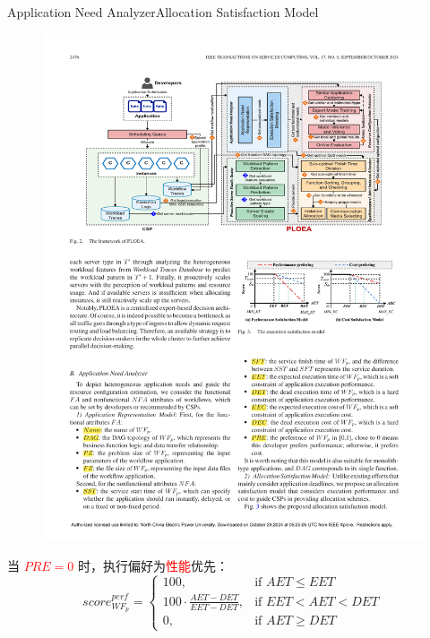 \documentclass[aspectratio=169]{beamer}
\begin{document}
\begin{frame}{Application Need Analyzer}{Allocation Satisfaction Model}
  \begin{figure}
    \centering
    \includegraphics[height=0.4\textheight]{img/method/satisfaction-model.pdf}
  \end{figure}
  当 \textcolor{red}{$PRE=0$} 时，执行偏好为\textcolor{red}{性能}优先：
  \begin{equation*}
    score_{WF_p}^{perf} =
    \begin{cases}
      100, & \text{if } AET \leqslant EET \\
      100 \cdot \frac{AET - DET}{EET - DET}, & \text{if } EET < AET < DET \\
      0, & \text{if } AET \geqslant DET
    \end{cases}
  \end{equation*}
\end{frame}
\end{document}
